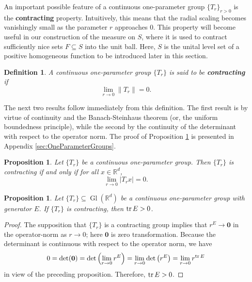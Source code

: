 \documentclass[11pt, letter]{book}
\newtheorem{definition}[theorem]{Definition}
\newtheorem{proposition}[theorem]{Proposition}
\newcommand\Gl{\operatorname{Gl}} %
\renewcommand\det{\operatorname{det}}
\begin{document}
\noindent An important possible feature of a continuous one-parameter group $\{T_r \}_{r>0}$ is the \textbf{contracting} property. Intuitively, this means that the radial scaling becomes vanishingly small as the parameter $r$ approaches $0$. This property will become useful in our construction of the measure on $S$, where it is used to contract sufficiently nice sets $F\subseteq S$ into the unit ball. Here, $S$ is the unital level set of a positive homogeneous function to be introduced later in this section.
\begin{framed}
\begin{definition} \label{def:contracting_group} A continuous one-parameter group $\{T_r\}$ is said to be \textbf{contracting} if
\begin{equation*}
\lim_{r\to 0}\|T_r\|=0. 
\end{equation*}
\end{definition}
\end{framed}

\noindent The next two results follow immediately from this definition. The first result is by virtue of continuity and the Banach-Steinhaus theorem (or, the uniform boundedness principle), while the second by the continuity of the determinant with respect to the operator norm. The proof of Proposition \ref{prop:ContractingCharacterization} is presented in Appendix \ref{sec:OneParameterGroups}.
\begin{framed}
\begin{proposition}\label{prop:ContractingCharacterization}
Let $\{T_r\}$ be a continuous one-parameter group. Then $\{T_r\}$ is contracting if and only if for all $x\in\mathbb{R}^d$,
\begin{equation}
\lim_{r\to 0}|T_r x|=0.
\end{equation}
\end{proposition}
\end{framed}

\begin{framed}
\begin{proposition}\label{prop:ContractingTrace}
Let $\{T_r\}\subseteq \Gl(\mathbb{R}^d)$ be a continuous one-parameter group with generator $E$. If $\{T_r\}$ is  contracting, then $\tr E>0$.
\end{proposition}
\end{framed}
\begin{proof}
The supposition that $\{T_r\}$ is a contracting group implies that $r^E\to \mathbf{0}$ in the operator-norm as $r\to 0$; here $\mathbf{0}$ is zero transformation. Because the determinant is continuous with respect to the operator norm, we have
\begin{equation*}
0=\det(\mathbf{0})=\det\left(\lim_{r\to 0}r^E\right)=\lim_{r\to 0}\det\left(r^E\right)=\lim_{r\to 0}r^{\tr E}
\end{equation*}
in view of the preceding proposition. Therefore, $\tr E>0$.
\end{proof}
\end{document}
